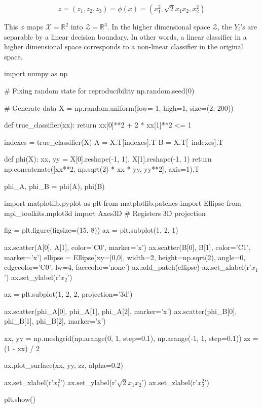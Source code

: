 \[ z = (z_1, z_2, z_3) = \phi(x) = (x_1^2, \sqrt{2} x_1 x_2, x_2^2) \]

This \(\phi\) maps \(\mathcal{X} = \mathbb{R}^2\) into
\(\mathcal{Z} = \mathbb{R}^3\). In the higher dimensional space
\(\mathcal{Z}\), the \(Y_i\)'s are separable by a linear decision
boundary. In other words, a linear classifier in a higher dimensional
space corresponds to a non-linear classifier in the original space.

\begin{python}
import numpy as np


# Fixing random state for reproducibility
np.random.seed(0)

# Generate data
X = np.random.uniform(low=-1, high=1, size=(2, 200))

def true_classifier(xx):
    return xx[0]**2 + 2 * xx[1]**2 <= 1

indexes = true_classifier(X)
A = X.T[indexes].T
B = X.T[~indexes].T

def phi(X):
    xx, yy = X[0].reshape(-1, 1), X[1].reshape(-1, 1)
    return np.concatenate([xx**2, np.sqrt(2) * xx * yy, yy**2], axis=1).T

phi_A, phi_B = phi(A), phi(B)
\end{python}

\begin{python}
import matplotlib.pyplot as plt
from matplotlib.patches import Ellipse
from mpl_toolkits.mplot3d import Axes3D  # Registers 3D projection

fig = plt.figure(figsize=(15, 8))
ax = plt.subplot(1, 2, 1)

ax.scatter(A[0], A[1], color='C0', marker='x')
ax.scatter(B[0], B[1], color='C1', marker='x')
ellipse = Ellipse(xy=[0,0], width=2, height=np.sqrt(2), angle=0,
              edgecolor='C0', lw=4, facecolor='none')
ax.add_patch(ellipse)
ax.set_xlabel(r'$x_1$')
ax.set_ylabel(r'$x_2$')

ax = plt.subplot(1, 2, 2, projection='3d')

ax.scatter(phi_A[0], phi_A[1], phi_A[2], marker='x')
ax.scatter(phi_B[0], phi_B[1], phi_B[2], marker='x')

xx, yy = np.meshgrid(np.arange(0, 1, step=0.1), np.arange(-1, 1, step=0.1))
zz = (1 - xx) / 2

ax.plot_surface(xx, yy, zz, alpha=0.2)

ax.set_xlabel(r'$x_1^2$')
ax.set_ylabel(r'$\sqrt{2} x_1 x_2$')
ax.set_zlabel(r'$x_2^2$')

plt.show()
\end{python}

